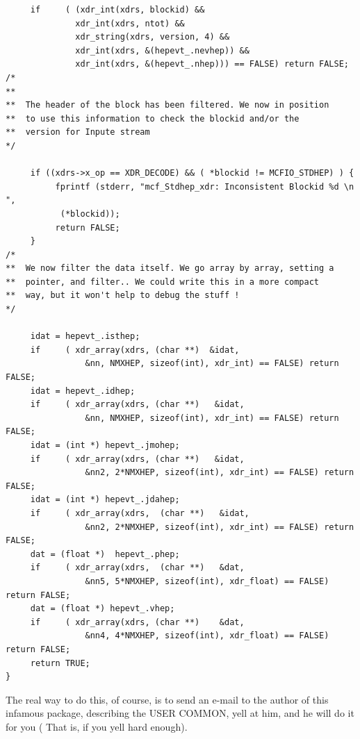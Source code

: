 \begin{verbatim}
     if     ( (xdr_int(xdrs, blockid) &&
     	      xdr_int(xdrs, ntot) &&
     	      xdr_string(xdrs, version, 4) &&
     	      xdr_int(xdrs, &(hepevt_.nevhep)) &&
              xdr_int(xdrs, &(hepevt_.nhep))) == FALSE) return FALSE;
/*
**
**	The header of the block has been filtered. We now in position
**	to use this information to check the blockid and/or the
**	version for Inpute stream
*/

     if ((xdrs->x_op == XDR_DECODE) && ( *blockid != MCFIO_STDHEP) ) {
          fprintf (stderr, "mcf_Stdhep_xdr: Inconsistent Blockid %d \n ",
           (*blockid));
          return FALSE;
     }
/*
**	We now filter the data itself. We go array by array, setting a
**	pointer, and filter.. We could write this in a more compact
**	way, but it won't help to debug the stuff !
*/

     idat = hepevt_.isthep;
     if     ( xdr_array(xdrs, (char **)  &idat,
                &nn, NMXHEP, sizeof(int), xdr_int) == FALSE) return FALSE;
     idat = hepevt_.idhep;
     if     ( xdr_array(xdrs, (char **)   &idat,
                &nn, NMXHEP, sizeof(int), xdr_int) == FALSE) return FALSE;
     idat = (int *) hepevt_.jmohep;
     if     ( xdr_array(xdrs, (char **)   &idat,
                &nn2, 2*NMXHEP, sizeof(int), xdr_int) == FALSE) return FALSE;
     idat = (int *) hepevt_.jdahep;
     if     ( xdr_array(xdrs,  (char **)   &idat,
                &nn2, 2*NMXHEP, sizeof(int), xdr_int) == FALSE) return FALSE;
     dat = (float *)  hepevt_.phep;
     if     ( xdr_array(xdrs,  (char **)   &dat,
                &nn5, 5*NMXHEP, sizeof(int), xdr_float) == FALSE) return FALSE;
     dat = (float *) hepevt_.vhep;
     if     ( xdr_array(xdrs, (char **)    &dat,
                &nn4, 4*NMXHEP, sizeof(int), xdr_float) == FALSE) return FALSE;
     return TRUE;
}

\end{verbatim}

The real way to do this, of course, is to send an e-mail to the
author of this infamous package, describing the USER COMMON, yell
at him, and he will do it for you ( That is, if you yell hard enough).





